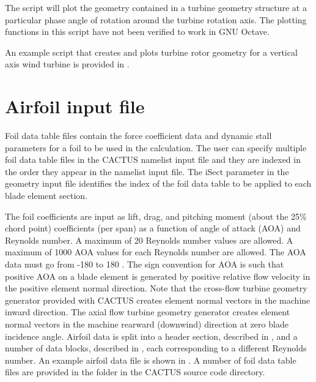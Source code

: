 The script  will plot the geometry contained in a turbine geometry structure at a particular phase angle of rotation around the turbine rotation axis. The plotting functions in this script have not been verified to work in GNU Octave.

An example script that creates and plots turbine rotor geometry for a vertical axis wind turbine is provided in .

\section{Airfoil input file}
Foil data table files contain the force coefficient data and dynamic stall parameters for a foil to be used in the calculation. The user can specify multiple foil data table files in the CACTUS namelist input file and they are indexed in the order they appear in the namelist input file. The iSect parameter in the geometry input file identifies the index of the foil data table to be applied to each blade element section.

The foil coefficients are input as lift, drag, and pitching moment (about the 25\% chord point) coefficients (per span) as a function of angle of attack (AOA) and Reynolds number. A maximum of 20 Reynolds number values are allowed. A maximum of 1000 AOA values for each Reynolds number are allowed. The AOA data must go from -180 \si{\deg} to 180 \si{\deg}. The sign convention for AOA is such that positive AOA on a blade element is generated by positive relative flow velocity in the positive element normal direction. Note that the cross-flow turbine geometry generator provided with CACTUS creates element normal vectors in the machine inward direction. The axial flow turbine geometry generator creates element normal vectors in the machine rearward (downwind) direction at zero blade incidence angle. 
Airfoil data is split into a header section, described in , and a number of data blocks, described in , each corresponding to a different Reynolds number. An example airfoil data file is shown in . A number of foil data table files are provided in the  folder in the CACTUS source code directory.


